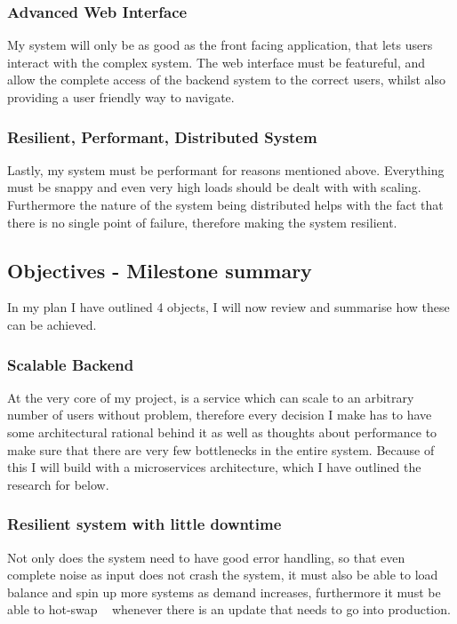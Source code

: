 \documentclass[titlepage]{article}
\begin{document}
\subsubsection{Advanced Web Interface}
My system will only be as good as the front facing application, that lets users interact with the complex system. The web interface must be featureful, and allow the complete access of the backend system to the correct users, whilst also providing a user friendly way to navigate.

\subsubsection{Resilient, Performant, Distributed System}
Lastly, my system must be performant for reasons mentioned above. Everything must be snappy and even very high loads should be dealt with with scaling. Furthermore the nature of the system being distributed helps with the fact that there is no single point of failure, therefore making the system resilient.

\subsection{Objectives - Milestone summary}

In my plan I have outlined 4 objects, I will now review and summarise how these can be achieved.

\subsubsection{Scalable Backend}
At the very core of my project, is a service which can scale to an arbitrary number of users without problem, therefore every decision I make has to have some architectural rational behind it as well as thoughts about performance to make sure that there are very few bottlenecks in the entire system. Because of this I will build with a microservices architecture, which I have outlined the research for below.

\subsubsection{Resilient system with little downtime}
Not only does the system need to have good error handling, so that even complete noise as input does not crash the system, it must also be able to load balance and spin up more systems as demand increases, furthermore it must be able to hot-swap ~\cite{hot_swap} whenever there is an update that needs to go into production. 
\end{document}
